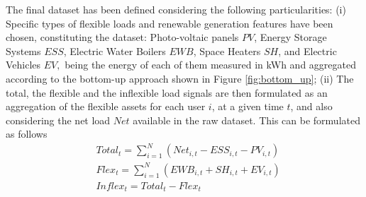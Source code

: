 \begin{table}[htbp]
\centering
{}
\label{table:dataport_austin}
\end{table}

The final dataset has been defined considering the following particularities: (i) Specific types of flexible loads and renewable generation features have been chosen, constituting the dataset: Photo-voltaic panels $PV$, Energy Storage Systems $ESS$, Electric Water Boilers $EWB$, Space Heaters $SH$, and Electric Vehicles $EV,$ being the energy of each of them measured in kWh and aggregated according to the bottom-up approach shown in Figure \ref{fig:bottom_up}; (ii) The total, the flexible and the inflexible load signals are then formulated as an aggregation of the flexible assets for each user $i$, at a given time $t$, and also considering the net load $Net$ available in the raw dataset. This can be formulated as follows 
\begin{subequations}
\begin{align} 
  & Total_{t} = \sum_{i=1}^{N} (Net_{i,t} - ESS_{i,t} - PV_{i,t}) \\
  & Flex_{t} = \sum_{i=1}^{N} (EWB_{i,t} +  SH_{i,t} + EV_{i,t}) \\
  & Inflex_{t} = Total_{t} - Flex_{t}
\end{align}
\end{subequations}

